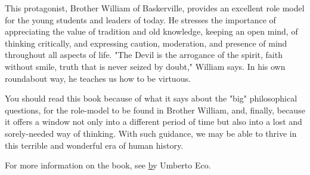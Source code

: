    This protagonist, Brother William of Baskerville, provides an excellent
   role model for the young students and leaders of today. He stresses the
   importance of appreciating the value of tradition and old knowledge,
   keeping an open mind, of thinking critically, and expressing caution,
   moderation, and presence of mind throughout all aspects of life. "The
   Devil is the arrogance of the spirit, faith without smile, truth that
   is never seized by doubt," William says. In his own roundabout way, he
   teaches us how to be virtuous.

   You should read this book because of what it says about the "big"
   philosophical questions, for the role-model to be found in Brother
   William, and, finally, because it offers a window not only into a
   different period of time but also into a lost and sorely-needed way of
   thinking. With such guidance, we may be able to thrive in this terrible
   and wonderful era of human history.

   For more information on the book, see \href{The Name of the Rose} by
   Umberto Eco.

